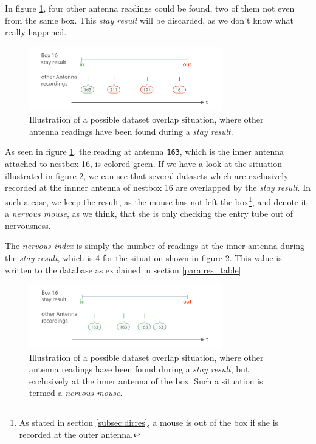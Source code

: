 In figure \ref{fig:dataset_overlap}, four other antenna readings could be found, two of them not even from the same box. This \textit{stay result} will be discarded, as we don't know what really happened.

\begin{figure}[htpb]
\begin{center}
  \includegraphics[width=0.75\textwidth]{assets/pdf/dataset_overlap_schema.pdf}
  \caption[Dataset overlap situation]{Illustration of a possible dataset overlap situation, where other antenna readings have been found during a \textit{stay result}.}
  \label{fig:dataset_overlap}
\end{center}
\end{figure}

As seen in figure \ref{fig:dataset_overlap}, the reading at antenna \lstinline|163|, which is the inner antenna attached to nestbox 16, is colored green. If we have a look at the situation illustrated in figure \ref{fig:dataset_overlap_nervous}, we can see that several datasets which are exclusively recorded at the innner antenna of nestbox 16 are overlapped by the \textit{stay result}. In such a case, we keep the result, as the  mouse has not left the box\footnote{As stated in section \ref{subsec:dirres}, a mouse is out of the box if she is recorded at the outer antenna.}, and denote it a \textit{nervous mouse}, as we think, that she is only checking the entry tube out of nervousness.

The \textit{nervous index} is simply the number of readings at the inner antenna during the \textit{stay result}, which is 4 for the situation shown in figure \ref{fig:dataset_overlap_nervous}. This value is written to the database as explained in section \ref{para:res_table}.

\begin{figure}[htpb]
\begin{center}
  \includegraphics[width=0.75\textwidth]{assets/pdf/dataset_overlap_nervous_schema.pdf}
  \caption[Dataset overlap situation for a \textit{nervous mouse}]{Illustration of a possible dataset overlap situation, where other antenna readings have been found during a \textit{stay result}, but exclusively at the inner antenna of the box. Such a situation is termed a \textit{nervous mouse}.}
  \label{fig:dataset_overlap_nervous}
\end{center}
\end{figure}

